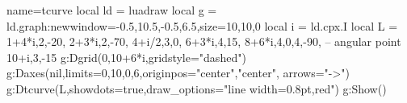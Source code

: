 \begin{luadraw}{name=tcurve}
local ld = luadraw
local g = ld.graph:new{window={-0.5,10.5,-0.5,6.5},size={10,10,0}}
local i = ld.cpx.I
local L = {
1+4*i,{2,-20},
2+3*i,{2,-70},
4+i/2,{3,0},
6+3*i,{4,15},
8+6*i,{4,0,4,-90}, -- angular point
10+i,{3,-15}}
g:Dgrid({0,10+6*i},{gridstyle="dashed"})
g:Daxes(nil,{limits={{0,10},{0,6}},originpos={"center","center"}, arrows="->"})
g:Dtcurve(L,{showdots=true,draw_options="line width=0.8pt,red"})
g:Show()
\end{luadraw}
